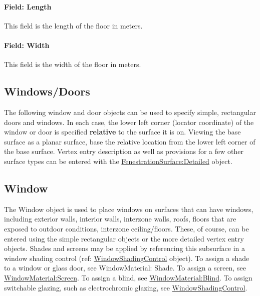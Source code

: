 \paragraph{Field: Length}\label{field-length-9}

This field is the length of the floor in meters.

\paragraph{Field: Width}\label{field-width-5}

This field is the width of the floor in meters.

\subsection{Windows/Doors}\label{windowsdoors}

The following window and door objects can be used to specify simple, rectangular doors and windows. In each case, the lower left corner (locator coordinate) of the window or door is specified \textbf{relative} to the surface it is on. Viewing the base surface as a planar surface, base the relative location from the lower left corner of the base surface. Vertex entry description as well as provisions for a few other surface types can be entered with the \hyperref[fenestrationsurfacedetailed]{FenestrationSurface:Detailed} object.

\subsection{Window}\label{window}

The Window object is used to place windows on surfaces that can have windows, including exterior walls, interior walls, interzone walls, roofs, floors that are exposed to outdoor conditions, interzone ceiling/floors. These, of course, can be entered using the simple rectangular objects or the more detailed vertex entry objects. Shades and screens may be applied by referencing this subsurface in a window shading control (ref: \hyperref[windowpropertyshadingcontrol]{WindowShadingControl} object). To assign a shade to a window or glass door, see WindowMaterial: Shade. To assign a screen, see \hyperref[windowmaterialscreen]{WindowMaterial:Screen}. To assign a blind, see \hyperref[windowmaterialblind]{WindowMaterial:Blind}. To assign switchable glazing, such as electrochromic glazing, see \hyperref[windowpropertyshadingcontrol]{WindowShadingControl}.


